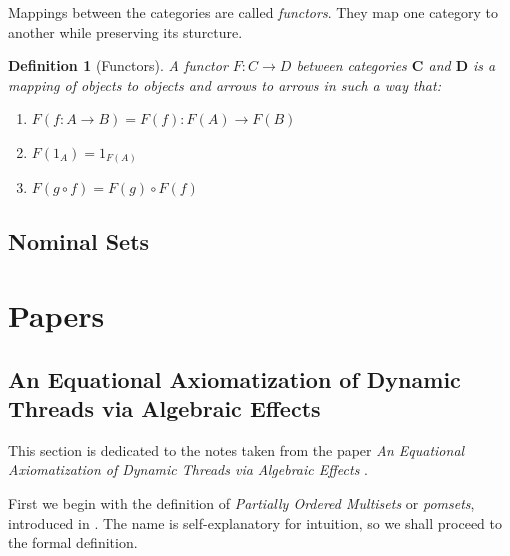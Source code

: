 \documentclass[12pt]{extarticle}
\newtheorem{defn}{Definition}[section]
\begin{document}
Mappings between the categories are called \emph{functors}. They map one category to another while preserving its sturcture. 

\begin{defn}[Functors]
    A \emph{functor} \(F : C \rightarrow D\) between categories \(\mathbf{C}\) and \(\mathbf{D}\) is a mapping of objects to objects and arrows to arrows in such a way that:
    \begin{enumerate}
        \item \(F (f: A \rightarrow B) = F(f) : F(A) \rightarrow F(B)\)
        \item \(F(1_A) = 1_{F(A)}\)
        \item \(F(g \circ f) = F(g) \circ F(f)\)
    \end{enumerate}
\end{defn}

\subsection{Nominal Sets}

\section{Papers}

\subsection{An Equational Axiomatization of Dynamic Threads via Algebraic Effects}

This section is dedicated to the notes taken from the paper \emph{An Equational Axiomatization of Dynamic Threads via Algebraic Effects} \cite{10.1145/3776706}.

First we begin with the definition of \emph{Partially Ordered Multisets} or \emph{pomsets}, introduced in \cite{Pratt1986ModelingCW}. The name is self-explanatory for intuition, so we shall proceed to the formal definition.
\end{document}
